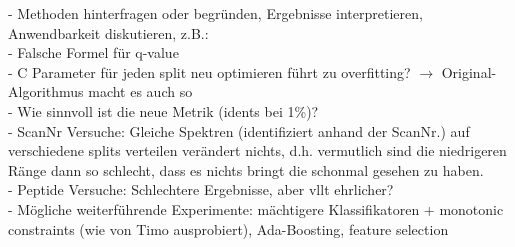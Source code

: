 - Methoden hinterfragen oder begründen, Ergebnisse interpretieren, Anwendbarkeit diskutieren, z.B.:\\
- Falsche Formel für q-value\\
- C Parameter für jeden split neu optimieren führt zu overfitting? $\rightarrow$ Original-Algorithmus macht es auch so\\
- Wie sinnvoll ist die neue Metrik (idents bei 1\%)?\\
- ScanNr Versuche: Gleiche Spektren (identifiziert anhand der ScanNr.) auf verschiedene splits verteilen verändert nichts, d.h. vermutlich sind die niedrigeren Ränge dann so schlecht, dass es nichts bringt die schonmal gesehen zu haben.\\
- Peptide Versuche: Schlechtere Ergebnisse, aber vllt ehrlicher?\\
- Mögliche weiterführende Experimente: mächtigere Klassifikatoren + monotonic constraints (wie von Timo ausprobiert), Ada-Boosting, feature selection
